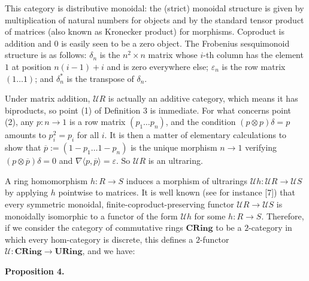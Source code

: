 \documentclass[10pt,a4paper]{amsart}
\begin{document}
 
 
This category is distributive monoidal: the (strict) monoidal structure is given by multiplication of natural numbers for objects and by the standard tensor product of matrices (also known as Kronecker product) for morphisms. Coproduct is addition and $0$ is easily seen to be a zero object. The Frobenius sesquimonoid structure is as follows: $\delta_{n}$ is the $n^{2}\times n$ matrix whose $i$-th column has the element $1$ at position $n(i-1)+i$ and is zero everywhere else; $\varepsilon_{n}$ is the row matrix $(1\ldots 1)$; and $\delta^{\ast}_{n}$ is the transpose of $\delta_{n}$.\par
 
 
 
Under matrix addition, $\mathcal{U}R$ is actually an additive category, which means it has biproducts, so point (1) of Definition 3 is immediate. For what concerns point (2), any $p:n\to 1$ is a row matrix $(p_{1}\ldots p_{n})$, and the condition $(p\otimes p)\delta=p$ amounts to $p_{i}^{2}=p_{i}$ for all $i$. It is then a matter of elementary calculations to show that $\overline{p}:=(1-p_{1}\ldots 1-p_{n})$ is the unique morphism $n\to 1$ verifying $(p\otimes\overline{p})\delta=0$ and $\nabla\langle p,\overline{p}\rangle=\varepsilon$. So $\mathcal{U}R$ is an ultraring.\par
 
 
 
A ring homomorphism $h:R\to S$ induces a morphism of ultrarings $\mathcal{U}h:\mathcal{U}R\to\mathcal{U}S$ by applying $h$ pointwise to matrices. It is well known (see for instance [7]) that every symmetric monoidal, finite-coproduct-preserving functor $\mathcal{U}R\to\mathcal{U}S$ is monoidally isomorphic to a functor of the form $\mathcal{U}h$ for some $h:R\to S$. Therefore, if we consider the category of commutative rings $\mathbf{CRing}$ to be a $2$-category in which every hom-category is discrete, this defines a $2$-functor $\mathcal{U}:\mathbf{CRing}\to\mathbf{URing}$, and we have:\par
 
 
 
\par\medskip\noindent\textbf{Proposition 4.}\par
 
\end{document}
